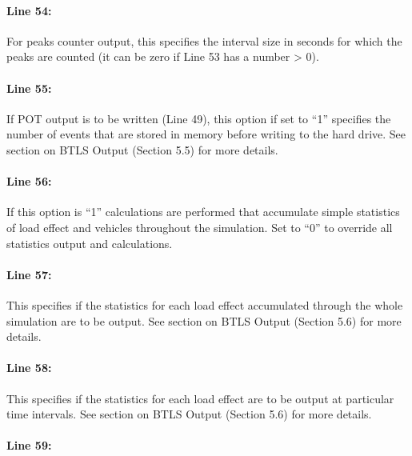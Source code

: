 \documentclass[
]{article}
\begin{document}
\paragraph*{Line 54:}\label{line-54}

For peaks counter output, this specifies the interval size in seconds
for which the peaks are counted (it can be zero if Line 53 has a number
\textgreater{} 0).

\paragraph*{Line 55:}\label{line-55}

If POT output is to be written (Line 49), this option if set to ``1''
specifies the number of events that are stored in memory before writing
to the hard drive. See section on BTLS Output (Section 5.5) for more
details.

\paragraph*{Line 56:}\label{line-56}

If this option is ``1'' calculations are performed that accumulate
simple statistics of load effect and vehicles throughout the simulation.
Set to ``0'' to override all statistics output and calculations.

\paragraph*{Line 57:}\label{line-57}

This specifies if the statistics for each load effect accumulated
through the whole simulation are to be output. See section on BTLS
Output (Section 5.6) for more details.

\paragraph*{Line 58:}\label{line-58}

This specifies if the statistics for each load effect are to be output
at particular time intervals. See section on BTLS Output (Section 5.6)
for more details.

\paragraph*{Line 59:}\label{line-59}
\end{document}
